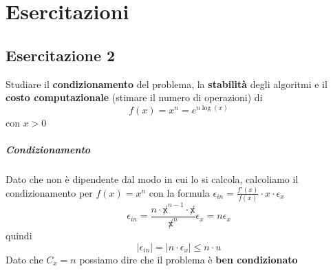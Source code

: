 \documentclass[10pt]{book}
\begin{document}
\chapter{Esercitazioni}
\section{Esercitazione 2}
Studiare il \textbf{condizionamento} del problema, la \textbf{stabilità} degli algoritmi e il \textbf{costo computazionale} (stimare il numero di operazioni) di $$f(x) = x^n = e^{n\log(x)}$$ con $x > 0$
\paragraph{Condizionamento} Dato che non è dipendente dal modo in cui lo si calcola, calcoliamo il condizionamento per $f(x) = x^n$ con la formula $\epsilon_{in} = \frac{f'(x)}{f(x)}\cdot x\cdot\epsilon_x$ $$\epsilon_{in} = \frac{n\cdot \not x^{n-1} \cdot \not x}{\not x^n}\epsilon_x = n\epsilon_x$$ quindi $$|\epsilon_{in}| = |n\cdot \epsilon_x| \leq n\cdot u$$
Dato che $C_x = n$ possiamo dire che il problema è \textbf{ben condizionato}
\end{document}
